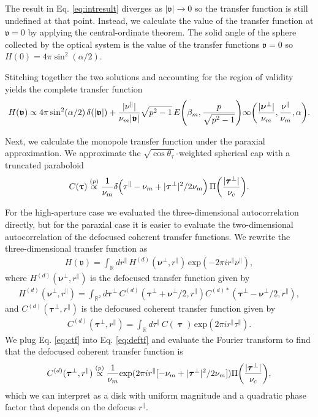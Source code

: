 \documentclass[]{osa-article}
\let\originalleft\left
\let\originalright\right
\renewcommand{\left}{\mathopen{}\mathclose\bgroup\originalleft}
\renewcommand{\right}{\aftergroup\egroup\originalright}
\newcommand{\mypar}{\parallel}
\providecommand{\mbb}[1]{\mathbb{#1}}
\providecommand{\bs}[1]{\boldsymbol{#1}}
\providecommand{\bv}{\boldsymbol{\mathfrak{v}}}
\providecommand{\bvperp}{\bs{\nu}^{\bot}}
\providecommand{\bvpar}{\nu^{\parallel}}
\providecommand{\bt}{\bs{\uptau}}
\providecommand{\btperp}{\bs{\tau}^{\bot}}
\providecommand{\btpar}{\tau^{\mypar}}
\providecommand{\propp}{\stackrel{(p)}{\propto}}
\begin{document}
The result in Eq. \eqref{eq:intresult} diverges as $|\bv| \rightarrow 0$ so the transfer function is still undefined at that point. Instead, we calculate the value of the transfer function at $\bv = 0$ by applying the central-ordinate theorem. The solid angle of the sphere collected by the optical system is the value of the transfer functions $\bv = 0$ so $H(0) = 4\pi\sin^2(\alpha/2)$.

Stitching together the two solutions and accounting for the region of validity yields the complete transfer function
\begin{align}
  H(\bv) \propto 4\pi\sin^2(\alpha/2)\,\delta(|\bv|) + \frac{|\bvpar|}{\nu_m|\bv|}\sqrt{p^2 - 1}\,E\left(\beta_m, \frac{p}{\sqrt{p^2 - 1}}\right)\infty\left(\frac{|\bvperp|}{\nu_m}, \frac{\bvpar}{\nu_m}, \alpha \right).
\end{align}

Next, we calculate the monopole transfer function under the paraxial approximation. We approximate the $\sqrt{\cos\theta_\tau}$-weighted spherical cap with a truncated paraboloid
\begin{align}
  C(\bt) \propp \frac{1}{\nu_m}\delta\left(\btpar - \nu_m + |\btperp|^2/2\nu_m\right)\,\Pi\left(\frac{|\btperp|}{\nu_c}\right). \label{eq:ctf}
\end{align}

For the high-aperture case we evaluated the three-dimensional autocorrelation
directly, but for the paraxial case it is easier to evaluate the two-dimensional
autocorrelation of the defocused coherent transfer functions. We rewrite the
three-dimensional transfer function as
\begin{align}
  H(\bv) = \int_{\mbb{R}}dr^{\mypar}\,H^{(d)}(\bvperp,r^{\mypar})\,\text{exp}(-2\pi i r^{\mypar}\bvpar),\label{eq:def3dtf}
\end{align}
where $H^{(d)}(\bvperp,r^{\mypar})$ is the defocused transfer function given by
\begin{align}
  H^{(d)}(\bvperp,r^{\mypar}) = \int_{\mbb{R}^2}d\btperp\,C^{(d)}(\btperp + \bvperp/2, r^{\mypar})C^{(d)*}(\btperp - \bvperp/2, r^{\mypar}), \label{eq:defautocorr}
\end{align}
and $C^{(d)}(\btperp, r^{\mypar})$ is the defocused coherent transfer function given by
\begin{align}
  C^{(d)}(\btperp, r^{\mypar}) = \int_{\mbb{R}}d\btpar\, C(\bt)\,\text{exp}(2\pi i r^{\mypar}\btpar).\label{eq:deftf}
\end{align}
We plug Eq. \eqref{eq:ctf} into Eq. \eqref{eq:deftf} and evaluate the Fourier transform to find that the defocused coherent transfer function is
\begin{align}
  C^{(d)}(\btperp, r^{\mypar}) \propp \frac{1}{\nu_m}\text{exp}(2\pi i r^{\mypar}[-\nu_m + |\btperp|^2/2\nu_m])\Pi\left(\frac{|\btperp|}{\nu_c}\right), \label{eq:defctf}
\end{align}
which we can interpret as a disk with uniform magnitude and a quadratic phase factor that depends on the defocus $r^{\mypar}$. 
\end{document}
